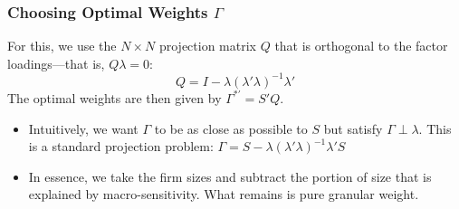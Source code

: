 \documentclass[aspectratio=169,11pt]{beamer}
\begin{document}
\begin{frame}[label=src_propositions]
    \frametitle{Choosing Optimal Weights $\Gamma$}
    For this, we use the $N \times N$ projection matrix $Q$ that is orthogonal to the factor loadings—that is, $Q \lambda = 0$:
    \begin{equation*}
        Q = I - \lambda (\lambda' \lambda)^{-1} \lambda'
    \end{equation*}
    The optimal weights are then given by $\Gamma^{*\prime} = S'Q$. \hyperlink{app_propositions}{}
    \begin{itemize}
        \item Intuitively, we want $\Gamma$ to be as close as possible to $S$ but satisfy $\Gamma \perp \lambda$. This is a standard projection problem: $\Gamma = S - \lambda (\lambda' \lambda)^{-1} \lambda' S$
        \item In essence, we take the firm sizes and subtract the portion of size that is explained by macro-sensitivity. What remains is pure granular weight.
    \end{itemize}

\end{frame}





\end{document}
